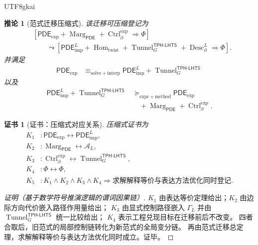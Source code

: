 \documentclass[12pt]{article}
\newtheorem{corollary}{推论}[section]
\newtheorem{Certificate}{证书}[section]
\newcommand{\TPHLHTS}{\ensuremath{\mathsf{TPH\mbox{-}LHTS}}}
\newcommand{\PDE}{\ensuremath{\mathsf{PDE}}}
\DeclareMathOperator{\Tunnel}{Tunnel}
\DeclareMathOperator{\Marg}{Marg}
\DeclareMathOperator{\Ctrl}{Ctrl}
\DeclareMathOperator{\Desc}{Desc}
\DeclareMathOperator{\Hom}{Hom}
\begin{document}
\begin{CJK*}{UTF8}{gkai}
\begin{corollary}[范式迁移压缩式]
\label{cor:tex58-paradigm-migration-compressed}
该迁移可压缩登记为
\[
  \boxed{
  \begin{aligned}
  &\left[
  \PDE_{\mathrm{exp}}
  +
  \Marg_{\PDE}
  +
  \Ctrl_{\partial}^{\mathrm{exp}}
  \Rightarrow
  \Phi
  \right]\\
  &\qquad\leadsto
  \left[
  \PDE_{\mathrm{imp}}^L
  +
  \Hom_{\mathrm{twist}}
  +
  \Tunnel_G^{\TPHLHTS}
  +
  \Desc_{\partial}^{L}
  \Rightarrow
  \Phi
  \right].
  \end{aligned}
  }
\]
并满足
\[
  \boxed{
  \begin{aligned}
  \PDE_{\mathrm{exp}}
  &\equiv_{\mathrm{solve+interp}}
  \PDE_{\mathrm{imp}}^L
  +
  \Tunnel_G^{\TPHLHTS}
  \end{aligned}
  }
\]
以及
\[
  \boxed{
  \begin{aligned}
  \PDE_{\mathrm{imp}}^L
  +
  \Tunnel_G^{\TPHLHTS}
  &\succcurlyeq_{\mathrm{expr+method}}
  \PDE_{\mathrm{exp}}\\
  &\quad+
  \Marg_{\PDE}
  +
  \Ctrl_{\partial}^{\mathrm{exp}}.
  \end{aligned}
  }
\]
\end{corollary}

\begin{Certificate}[证书：压缩式对应关系]
\label{cert:tex58-paradigm-migration-compressed}
压缩式证书为
\[
\begin{aligned}
  K_1 &: \PDE_{\mathrm{exp}}\leftrightarrow\PDE_{\mathrm{imp}}^L,\\
  K_2 &: \Marg_{\PDE}\leftrightarrow\mathcal A_L,\\
  K_3 &: \Ctrl_{\partial}^{\mathrm{exp}}\leftrightarrow\Tunnel_G^{\TPHLHTS},\\
  K_4 &: \Phi\leftrightarrow\Phi,\\
  K_5 &: K_1\wedge K_2\wedge K_3\wedge K_4
  \Rightarrow
  \text{求解解释等价与表达方法优化同时登记}.
\end{aligned}
\]
\end{Certificate}

\begin{proof}[证明（基于数学符号推演逻辑的谓词因果链）]
\(K_1\) 由表达等价定理给出；\(K_2\) 由边际方向代价嵌入路径作用量给出；
\(K_3\) 由显式控制路径嵌入 \(\Gamma_L\) 并由 \(\Tunnel_G^{\TPHLHTS}\) 统一比较给出；
\(K_4\) 表示工程兑现目标在迁移前后不改变。
四者合取后，旧范式的局部控制链转化为新范式的全局变分链。
再由范式迁移总定理，求解解释等价与表达方法优化同时成立。证毕。
\end{proof}


\end{CJK*}
\end{document}
